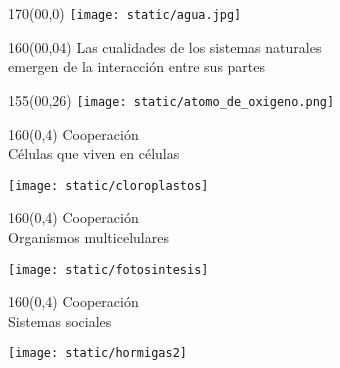 \documentclass[shownotes,aspectratio=169]{beamer}
\begin{document}
\begin{frame}[plain]
\begin{textblock}{170}(00,0) \centering
\texttt{[image: static/agua.jpg]}
\end{textblock}

\begin{textblock}{160}(00,04) \centering
\LARGE Las cualidades de los sistemas naturales \\ \Large
emergen de la interacción entre sus partes
\end{textblock}
\vspace{1cm} \Large



\begin{textblock}{155}(00,26) \centering
\texttt{[image: static/atomo\_de\_oxigeno.png]}
\end{textblock}

\end{frame}


\begin{frame}[plain]
\begin{textblock}{160}(0,4)
 \centering \LARGE Cooperación \\
 \Large Células que viven en células
\end{textblock}
\vspace{1.3cm} \centering

\texttt{[image: static/cloroplastos]}

\end{frame}

\begin{frame}[plain]
\begin{textblock}{160}(0,4)
 \centering \LARGE Cooperación \\
 \Large Organismos multicelulares
\end{textblock}
\vspace{1.3cm} \centering

\texttt{[image: static/fotosintesis]}

\end{frame}

\begin{frame}[plain]
\begin{textblock}{160}(0,4)
 \centering \LARGE Cooperación \\
 \Large Sistemas sociales
\end{textblock}
\vspace{1.3cm} \centering

\texttt{[image: static/hormigas2]}

\end{frame}
\end{document}
